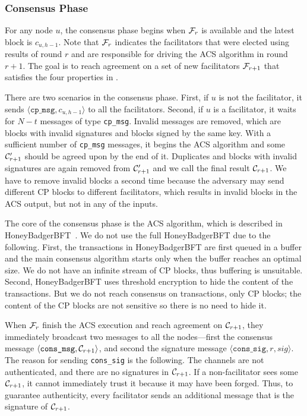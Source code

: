 \subsubsection{Consensus Phase}
\label{sec:consensus-phase}

For any node $u$,
the consensus phase begins when $\mathcal{F}_r$ is available and the latest block is $c_{u, h-1}$.
Note that $\mathcal{F}_r$ indicates the facilitators that were elected using results of round $r$ and are responsible for driving the ACS algorithm in round $r + 1$.
The goal is to reach agreement on a set of new facilitators $\mathcal{F}_{r + 1}$ that satisfies the four properties in .

There are two scenarios in the consensus phase.
First, if $u$ is not the facilitator, it sends $\langle \texttt{cp\_msg}, c_{u, h-1} \rangle$ to all the facilitators.
Second, if $u$ is a facilitator, it waits for $N - t$ messages of type \texttt{cp\_msg}.
Invalid messages are removed,
which are blocks with invalid signatures and blocks signed by the same key.
With a sufficient number of \texttt{cp\_msg} messages,
it begins the ACS algorithm and some $\mathcal{C}'_{r + 1}$ should be agreed upon by the end of it.
Duplicates and blocks with invalid signatures are again removed from $\mathcal{C}'_{r+1}$ and we call the final result $\mathcal{C}_{r+1}$.
We have to remove invalid blocks a second time because the adversary may send different CP blocks to different facilitators,
which results in invalid blocks in the ACS output, but not in any of the inputs.

The core of the consensus phase is the ACS algorithm,
which is described in HoneyBadgerBFT~\cite{miller2016honey}.
We do not use the full HoneyBadgerBFT due to the following.
First, the transactions in HoneyBadgerBFT are first queued in a buffer and the main consensus algorithm starts only when the buffer reaches an optimal size.
We do not have an infinite stream of CP blocks, thus buffering is unsuitable.
Second, HoneyBadgerBFT uses threshold encryption to hide the content of the transactions.
But we do not reach consensus on transactions, only CP blocks;
the content of the CP blocks are not sensitive so there is no need to hide it.

When $\mathcal{F}_{r}$ finish the ACS execution and reach agreement on $\mathcal{C}_{r+1}$,
they immediately broadcast two messages to all the nodes---first the consensus message $\langle \texttt{cons\_msg}, \mathcal{C}_{r+1} \rangle$,
and second the signature message $\langle \texttt{cons\_sig}, r, sig \rangle$.
The reason for sending \texttt{cons\_sig} is the following.
The channels are not authenticated, 
and there are no signatures in $\mathcal{C}_{r + 1}$.
If a non-facilitator sees some $\mathcal{C}_{r + 1}$, it cannot immediately trust it because it may have been forged.
Thus, to guarantee authenticity, every facilitator sends an additional message that is the signature of $\mathcal{C}_{r + 1}$.

